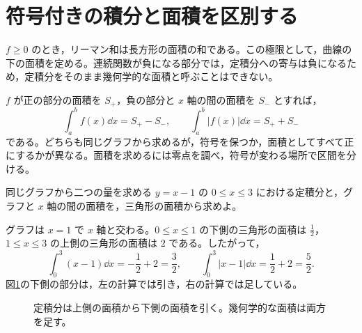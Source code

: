 \section{符号付きの積分と面積を区別する}\label{節:積分符号面積}
$f\ge0$ のとき，リーマン和は長方形の面積の和である。この極限として，曲線の下の面積を定める。連続関数が負になる部分では，定積分への寄与は負になるため，定積分をそのまま幾何学的な面積と呼ぶことはできない。

$f$ が正の部分の面積を $S_+$，負の部分と $x$ 軸の間の面積を $S_-$ とすれば，
\[
 \int_a^b f(x)\dd x=S_+-S_-,\qquad
 \int_a^b|f(x)|\dd x=S_++S_-
\]
である。どちらも同じグラフから求めるが，符号を保つか，面積としてすべて正にするかが異なる。面積を求めるには零点を調べ，符号が変わる場所で区間を分ける。

\begin{example}{同じグラフから二つの量を求める}
$y=x-1$ の $0\le x\le3$ における定積分と，グラフと $x$ 軸の間の面積を，三角形の面積から求めよ。
\end{example}
グラフは $x=1$ で $x$ 軸と交わる。$0\le x\le1$ の下側の三角形の面積は $\frac12$，$1\le x\le3$ の上側の三角形の面積は $2$ である。したがって，
\[
 \int_0^3(x-1)\dd x=-\frac12+2=\frac32,
 \qquad
 \int_0^3|x-1|\dd x=\frac12+2=\frac52.
\]
図\ref{図:定積分符号}の下側の部分は，左の計算では引き，右の計算では足している。

\begin{figure}[htbp]
\centering
{}
\caption{定積分は上側の面積から下側の面積を引く。幾何学的な面積は両方を足す。}
\label{図:定積分符号}
\end{figure}

